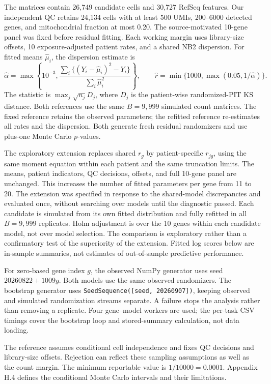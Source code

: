 \documentclass[12pt]{article}
\theoremstyle{remark}
\begin{document}
The matrices contain 26,749 candidate cells and 30,727 RefSeq features. Our
independent QC retains 24,134 cells with at least 500 UMIs, 200--6000 detected
genes, and mitochondrial fraction at most 0.20. The source-motivated 10-gene
panel was fixed before residual fitting. Each working margin uses library-size
offsets, 10 exposure-adjusted patient rates, and a shared NB2 dispersion.
For fitted means $\widehat\mu_i$, the dispersion estimate is
\[
\widehat\alpha=
\max\left\{10^{-3},
\frac{\sum_i\{(Y_i-\widehat\mu_i)^2-Y_i\}}
{\sum_i\widehat\mu_i^2}\right\},
\qquad
\widehat r=\min\{1000,\max(0.05,1/\widehat\alpha)\}.
\]
The statistic is $\max_j\sqrt{n_j}D_j$, where $D_j$ is the patient-wise
randomized-PIT KS distance. Both references use the same $B=9,999$ simulated
count matrices. The fixed reference retains the observed parameters; the
refitted reference re-estimates all rates and the dispersion. Both generate
fresh residual randomizers and use plus-one Monte Carlo $p$-values.

The exploratory extension replaces shared $r_g$ by patient-specific $r_{jg}$,
using the same moment equation within each patient and the same truncation
limits. The means, patient indicators, QC decisions, offsets, and full
10-gene panel are unchanged. This increases the number of fitted parameters
per gene from 11 to 20. The extension was specified in response to the
shared-model discrepancies and evaluated once, without searching over
models until the diagnostic passed. Each candidate is simulated from its
own fitted distribution and fully refitted in all $B=9,999$ replicates.
Holm adjustment is over the 10 genes within each candidate model, not over
model selection. The comparison is exploratory rather than a confirmatory
test of the superiority of the extension. Fitted log scores below are
in-sample summaries, not estimates of out-of-sample predictive performance.

For zero-based gene index $g$, the observed NumPy generator uses seed
$20260822+1009g$. Both models use the same observed randomizers. The
bootstrap generator uses \texttt{SeedSequence([seed, 20260907])}, keeping
observed and simulated randomization streams separate. A failure stops the
analysis rather than removing a replicate. Four gene--model workers are used;
the per-task CSV timings cover the bootstrap loop and stored-summary
calculation, not data loading.

The reference assumes conditional cell independence and fixes QC decisions
and library-size offsets. Rejection can reflect these sampling assumptions
as well as the count margin. The minimum reportable value is
$1/10000=0.0001$. Appendix H.4 defines the conditional Monte Carlo
intervals and their limitations.
\end{document}
